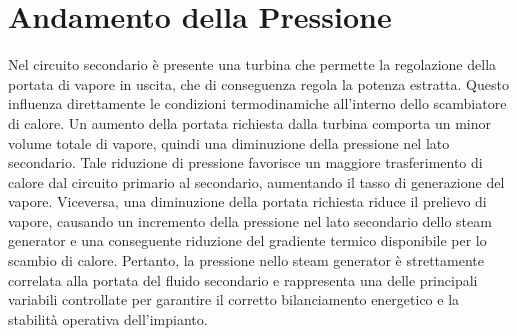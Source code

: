 \documentclass[12pt]{report}
\begin{document}
\chapter{Andamento della Pressione}
Nel circuito secondario è presente una turbina che permette la regolazione della portata di vapore in uscita, che di conseguenza regola la potenza estratta. Questo influenza direttamente le condizioni termodinamiche all'interno dello scambiatore di calore. Un aumento della portata richiesta dalla turbina comporta un minor volume totale di vapore, quindi una diminuzione della pressione nel lato secondario. Tale riduzione di pressione favorisce un maggiore trasferimento di calore dal circuito primario al secondario, aumentando il tasso di generazione del vapore. Viceversa, una diminuzione della portata richiesta riduce il prelievo di vapore, causando un incremento della pressione nel lato secondario dello steam generator e una conseguente riduzione del gradiente termico disponibile per lo scambio di calore. Pertanto, la pressione nello steam generator è strettamente correlata alla portata del fluido secondario e rappresenta una delle principali variabili controllate per garantire il corretto bilanciamento energetico e la stabilità operativa dell'impianto.
\end{document}
